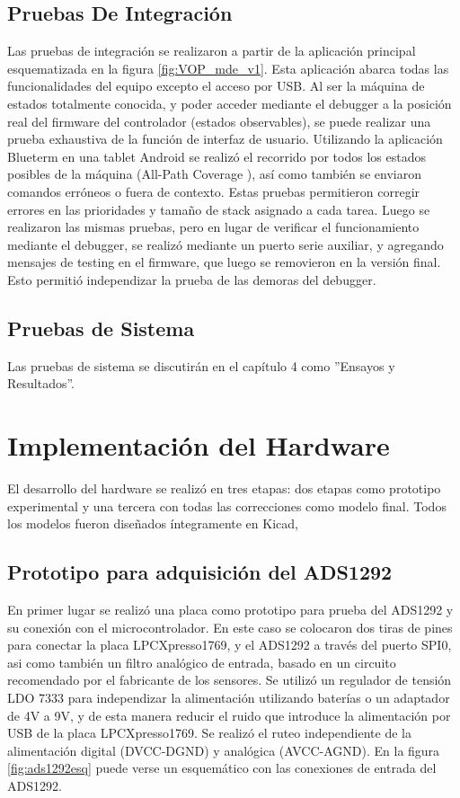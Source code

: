 \subsection{Pruebas De Integración} \label{pruebasIntegracion}

Las pruebas de integración se realizaron a partir de la aplicación principal esquematizada en la figura \ref{fig:VOP_mde_v1}. Esta aplicación abarca todas las funcionalidades del equipo excepto el acceso por USB. Al ser la máquina de estados totalmente conocida, y poder acceder mediante el debugger a la posición real del firmware del controlador (estados observables), se puede realizar una prueba exhaustiva de la función de interfaz de usuario. 
Utilizando la aplicación Blueterm en una tablet Android se realizó el recorrido por todos los estados posibles de la máquina (All-Path Coverage \citep{lin2013}), así como también se enviaron comandos erróneos o fuera de contexto. Estas pruebas permitieron corregir errores en las prioridades y tamaño de stack asignado a cada tarea.
Luego se realizaron las mismas pruebas, pero en lugar de verificar el funcionamiento mediante el debugger, se realizó mediante un puerto serie auxiliar, y agregando mensajes de testing en el firmware, que luego se removieron en la versión final. Esto permitió independizar la prueba de las demoras del debugger.


\subsection{Pruebas de Sistema} \label{pruebasSistema}

Las pruebas de sistema se discutirán en el capítulo 4 como ''Ensayos y Resultados''.

\section{Implementación del Hardware} \label{implementacionHw}

El desarrollo del hardware se realizó en tres etapas: dos etapas como prototipo experimental y una tercera con todas las correcciones como modelo final. Todos los modelos fueron diseñados íntegramente en Kicad,

\subsection{Prototipo para adquisición del ADS1292}

En primer lugar se realizó una placa como prototipo para prueba del ADS1292 y su conexión con el microcontrolador. En este caso se colocaron dos tiras de pines para conectar la placa LPCXpresso1769, y el ADS1292 a través del puerto SPI0, asi como también un filtro analógico de entrada, basado en un circuito recomendado por el fabricante de los sensores. Se utilizó un regulador de tensión LDO 7333 para independizar la alimentación utilizando baterías o un adaptador de 4V a 9V, y de esta manera reducir el ruido que introduce la alimentación por USB de la placa LPCXpresso1769. 
Se realizó el ruteo independiente de la alimentación digital (DVCC-DGND) y analógica (AVCC-AGND). En la figura \ref{fig:ads1292esq} puede verse un esquemático con las conexiones de entrada del ADS1292.

